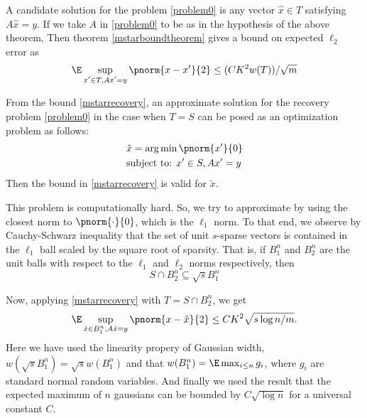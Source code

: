 A candidate solution for the problem \eqref{problem0} is any vector $\hat{x}\in T$
satisfying $A\hat{x} = y$.
If we take $A$ in \eqref{problem0} to be as in the hypothesis of the above theorem,
Then theorem \ref{mstarboundtheorem} gives a bound on expected $\ell_2$ error as
\begin{equation}\label{mstarrecovery}
	\E\sup_{\substack{{x'}\in T, A{x'}=y}}\pnorm{x-{x'}}{2}
		\leq ({CK^2} w(T))/{\sqrt{m}}
\end{equation}

From the bound \eqref{mstarrecovery}, an approximate solution for the recovery problem
\eqref{problem0} in the case when $T = S$
can be posed as an optimization problem as follows:
\begin{equation}\label{optprob0}
	\begin{split}
		&\tilde{x} = \arg\min\pnorm{x'}{0}\\
		&\text{subject to: } x'\in S,  Ax' = y
	\end{split}
\end{equation}
Then the bound in \eqref{mstarrecovery} is valid for $\tilde{x}$.

This problem is computationally hard. So, we try to approximate
by using the closest norm to $\pnorm{\cdot}{0}$, which is the $\ell_1$ norm.
To that end, we observe by Cauchy-Schwarz inequality  that
the set of unit $s$-sparse vectors is contained
in the $\ell_1$ ball scaled by the square root of sparsity.
That is, if $B_1^n$ and $B_2^n$ are the unit balls with respect
to the $\ell_1$ and $\ell_2$ norms respectively, then
\begin{equation}\label{inclusiontheorem}
	S\cap B_2^n\subseteq \sqrt{s} B_1^n
\end{equation}


Now, applying \eqref{mstarrecovery} with $T = S\cap B_2^n$, we get
\begin{equation}\label{scaledl1ball}
	\E\sup_{\hat{x}\in B_1^n, A\hat{x}=y}\pnorm{x-\hat{x}}{2}\leq
	CK^2\sqrt{{s\log n}/{m}}.
\end{equation}
Here we have used the linearity propery of Gaussian width, $w(\sqrt{s}B_1^n)=\sqrt{s}w(B_1^n)$
and that $w(B_1^n) = \E\max_{i\leq n} g_i$, where $g_i$ are standard normal random variables.
And finally we used the result that the expected maximum of $n$ gaussians can be
bounded by $C\sqrt{\log n}$ for a universal constant $C$.


